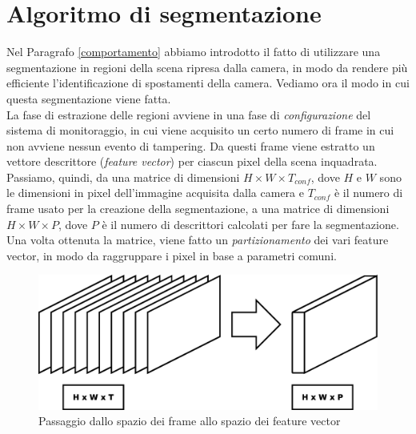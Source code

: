 \section{Algoritmo di segmentazione}
\label{segmentazione}
Nel Paragrafo \ref{comportamento} abbiamo introdotto il fatto di utilizzare una segmentazione in regioni della scena ripresa dalla camera, in modo da rendere pi\`u efficiente l'identificazione di spostamenti della camera.
Vediamo ora il modo in cui questa segmentazione viene fatta.\\
La fase di estrazione delle regioni avviene in una fase di \textit{configurazione} del sistema di monitoraggio, in cui viene acquisito un certo numero di frame in cui non avviene nessun evento di tampering.
Da questi frame viene estratto un vettore descrittore (\textit{feature vector}) per ciascun pixel della scena inquadrata.
Passiamo, quindi, da una matrice di dimensioni $H\times W \times T_{conf}$, dove $H$ e $W$ sono le dimensioni in pixel dell'immagine acquisita dalla camera e $T_{conf}$ \`e il numero di frame usato per la creazione della segmentazione, a una matrice di dimensioni $H\times W \times P$, dove $P$ \`e il numero di descrittori calcolati per fare la segmentazione.\\
Una volta ottenuta la matrice, viene fatto un \textit{partizionamento} dei vari feature vector, in modo da raggruppare i pixel in base a parametri comuni.
\begin{figure}
	\centering
	\includegraphics[width=0.7\linewidth]{diagrammi/FeatureVector}
	\caption{Passaggio dallo spazio dei frame allo spazio dei feature vector}
	\label{fig:FeatureVector}
\end{figure}

